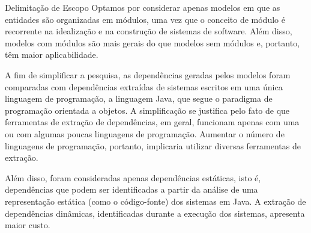 % 	
% 	
% 	

\begin{section}{Delimitação de Escopo}
	Optamos por considerar apenas modelos em que as entidades são organizadas em módulos, uma vez que o conceito de módulo é recorrente na idealização e na construção de sistemas de software. Além disso, modelos com módulos são mais gerais do que modelos sem módulos e, portanto, têm maior aplicabilidade.
	
	A fim de simplificar a pesquisa, as dependências geradas pelos modelos foram comparadas com dependências extraídas de sistemas escritos em uma única linguagem de programação, a linguagem Java, que segue o paradigma de programação orientada a objetos. A simplificação se justifica pelo fato de que ferramentas de extração de dependências, em geral, funcionam apenas com uma ou com algumas poucas linguagens de programação. Aumentar o número de linguagens de programação, portanto, implicaria utilizar diversas ferramentas de extração.
	
	Além disso, foram consideradas apenas dependências estáticas, isto é, dependências que podem ser identificadas a partir da análise de uma representação estática (como o código-fonte) dos sistemas em Java. A extração de dependências dinâmicas, identificadas durante a execução dos sistemas, apresenta maior custo.

\end{section}

